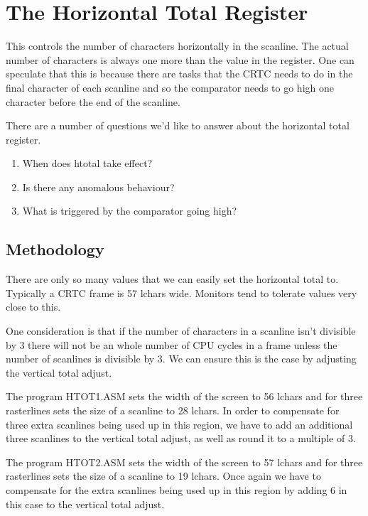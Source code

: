 \documentclass[a4paper,10pt]{amsart}
\begin{document}
\section{The Horizontal Total Register}

This controls the number of characters horizontally in the scanline. The actual
number of characters is always one more than the value in the register. One
can speculate that this is because there are tasks that the CRTC needs to do in
the final character of each scanline and so the comparator needs to go high one
character before the end of the scanline.

There are a number of questions we'd like to answer about the horizontal total
register.

\begin{enumerate}
\item When does htotal take effect?
\item Is there any anomalous behaviour?
\item What is triggered by the comparator going high?
\end{enumerate}

\subsection{Methodology}

There are only so many values that we can easily set the horizontal total to.
Typically a CRTC frame is 57 lchars wide. Monitors tend to tolerate values
very close to this.

One consideration is that if the number of characters in a scanline isn't
divisible by 3 there will not be an whole number of CPU cycles in a frame
unless the number of scanlines is divisible by 3. We can ensure this is the
case by adjusting the vertical total adjust.

The program HTOT1.ASM sets the width of the screen to 56 lchars and for three
rasterlines sets the size of a scanline to 28 lchars. In order to compensate
for three extra scanlines being used up in this region, we have to add an
additional three scanlines to the vertical total adjust, as well as round it
to a multiple of 3.

The program HTOT2.ASM sets the width of the screen to 57 lchars and for three
rasterlines sets the size of a scanline to 19 lchars. Once again we have to
compensate for the extra scanlines being used up in this region by adding
6 in this case to the vertical total adjust.
\end{document}
